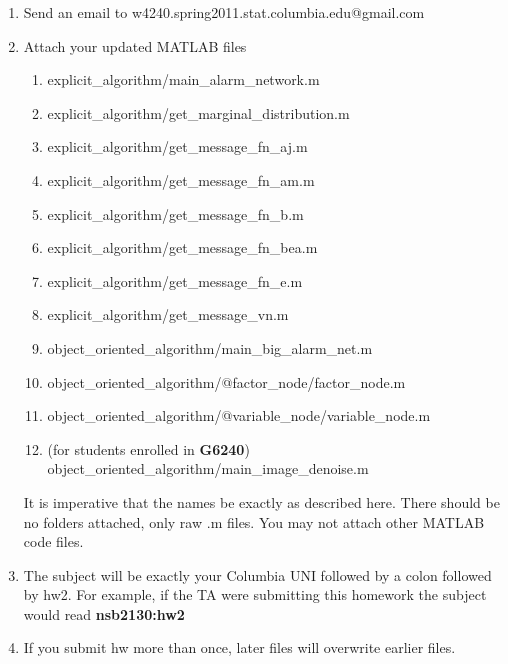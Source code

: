\documentclass[12pt]{article}
\begin{document}
\begin{enumerate}
	\item Send an email to w4240.spring2011.stat.columbia.edu@gmail.com
	\item {Attach your updated MATLAB files 
		\begin{enumerate}
			\item explicit\_algorithm/main\_alarm\_network.m
			\item explicit\_algorithm/get\_marginal\_distribution.m
			\item explicit\_algorithm/get\_message\_fn\_aj.m 
			\item explicit\_algorithm/get\_message\_fn\_am.m 
			\item explicit\_algorithm/get\_message\_fn\_b.m 
			\item explicit\_algorithm/get\_message\_fn\_bea.m
			\item explicit\_algorithm/get\_message\_fn\_e.m
			\item explicit\_algorithm/get\_message\_vn.m
			\item object\_oriented\_algorithm/main\_big\_alarm\_net.m
			\item object\_oriented\_algorithm/@factor\_node/factor\_node.m
			\item object\_oriented\_algorithm/@variable\_node/variable\_node.m
			\item (for students enrolled in {\bf G6240}) object\_oriented\_algorithm/main\_image\_denoise.m
		\end{enumerate} It is imperative that the names be exactly as described here. There should be no folders attached, only raw .m files.  You may not attach other MATLAB code files. }
	\item The subject will be exactly your Columbia UNI followed by a colon followed by hw2.  For example, if the TA were submitting this homework the subject would read {\bf nsb2130:hw2}
	\item If you submit hw more than once, later files will overwrite earlier files.
\end{enumerate}


\problemsdone
\end{document}
